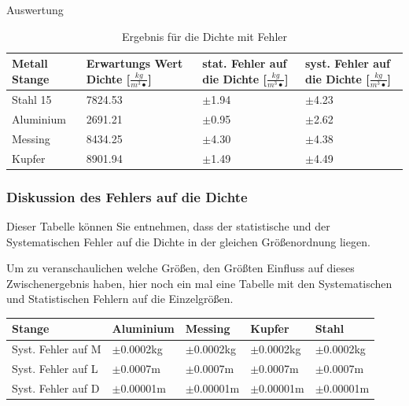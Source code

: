 \documentclass[twoside]{protokoll}
\begin{document}
\begin{aufgabe}{Auswertung}
 \begin{table}[H]
        \centering
        \begin{tabularx}{1\textwidth}{X X X X} %
            \toprule
            \textbf{Metall Stange} & \textbf{Erwartungs Wert Dichte [$\frac{kg}{m^3•}$]} & \textbf{stat. Fehler auf die Dichte [$\frac{kg}{m^3•}$]} & \textbf{syst. Fehler auf die Dichte [$\frac{kg}{m^3•}$]}\\
            \midrule
            Stahl 15 & 7824.53 & $\pm$1.94 & $\pm$4.23 \\
            Aluminium & 2691.21 & $\pm$0.95 & $\pm$2.62 \\
            Messing & 8434.25 & $\pm$4.30 & $\pm$4.38 \\
            Kupfer & 8901.94 & $\pm$1.49 & $\pm$4.49\\
            \bottomrule
        \end{tabularx}
        \label{tab:mytable}
        \caption{Ergebnis für die Dichte mit Fehler}
    \end{table}

\subsubsection{Diskussion des Fehlers auf die Dichte}
Dieser Tabelle können Sie entnehmen, dass der statistische und der Systematischen Fehler auf die Dichte in der gleichen Größenordnung liegen. 

Um zu veranschaulichen welche Größen, den Größten Einfluss auf dieses Zwischenergebnis haben, hier noch ein mal eine Tabelle mit den Systematischen 
und Statistischen Fehlern auf die Einzelgrößen. 

 \begin{table}[H]
        \centering
        \begin{tabularx}{1\textwidth}{l X X X X} %
            \toprule
            \textbf{Stange} & \textbf{Aluminium} & \textbf{Messing} & \textbf{Kupfer} & \textbf{Stahl} \\
            \midrule
            Syst. Fehler auf M & $\pm$0.0002kg & $\pm$0.0002kg & $\pm$0.0002kg & $\pm$0.0002kg \\
            Syst. Fehler auf L & $\pm$0.0007m & $\pm$0.0007m & $\pm$0.0007m & $\pm$0.0007m \\
            Syst. Fehler auf D & $\pm$0.00001m & $\pm$0.00001m & $\pm$0.00001m & $\pm$0.00001m \\


\end{tabularx}
\end{table}
\end{aufgabe}
\end{document}
